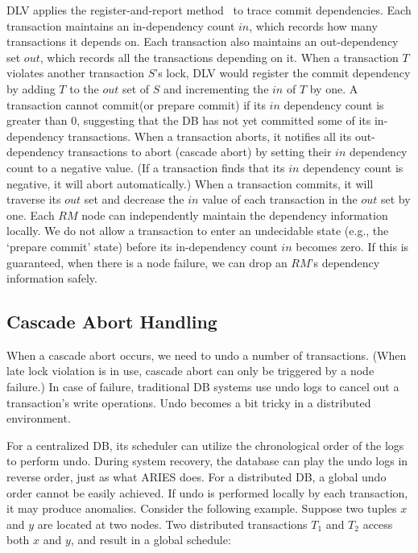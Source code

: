 \documentclass[conference]{IEEEtran}
\begin{document}
DLV applies the register-and-report method~\cite{HeckatonMVCC:journals/pvldb/LarsonBDFPZ11} to trace commit dependencies.
Each transaction maintains an in-dependency count ${in}$, which records how many transactions it depends on.
Each transaction also maintains an out-dependency set  ${out}$, which records all the transactions depending on it.
When a transaction ${T}$ violates another transaction ${S}$'s lock,
DLV would register the commit dependency by adding ${T}$ to the ${out}$ set of ${S}$ and incrementing the ${in}$ of ${T}$ by one.
A transaction cannot commit(or prepare commit) if its ${in}$ dependency count is greater than 0, suggesting that the DB has not yet committed some of its in-dependency transactions.
When a transaction aborts, it notifies all its out-dependency transactions to abort (cascade abort) by setting their ${in}$ dependency count to a negative value.
(If a transaction finds that its ${in}$ dependency count is negative, it will abort automatically.)
When a transaction commits, it will traverse its ${out}$ set and decrease the ${in}$ value of each transaction in the ${out}$ set by one.
Each $RM$ node can independently maintain the dependency information locally.
We do not allow a transaction to enter an undecidable state (e.g., the `prepare commit' state) before its in-dependency count ${in}$ becomes zero.
If this is guaranteed, when there is a node failure, we can drop an $RM$'s dependency information safely.

\subsection{Cascade Abort Handling}
When a cascade abort occurs, 
we need to undo a number of transactions.
(When late lock violation is in use, cascade abort can only be triggered by a node failure.)
In case of failure, traditional DB systems use undo logs to cancel out a transaction's write operations.
Undo becomes a bit tricky in a distributed environment.

For a centralized DB, its scheduler can utilize the chronological order of the logs to perform undo.
During system recovery, the database can play the undo logs in reverse order, just as what ARIES \cite{ARIES:journals/tods/MohanHLPS92} does.
For a distributed DB, a global undo order cannot be easily achieved.
If undo is performed locally by each transaction, it may produce anomalies.
Consider the following example. Suppose two tuples $x$ and $y$ are located at two nodes.
Two distributed transactions $T_1$ and $T_2$ access both $x$ and $y$, and result in a global schedule:
\end{document}
